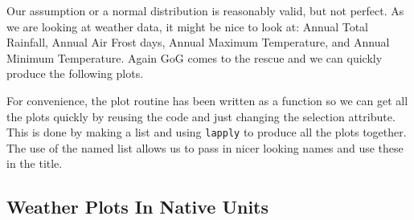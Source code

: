 \documentclass{article}
\begin{document}
Our assumption or a normal distribution is reasonably valid, but not perfect. As we are looking at weather data, it might be nice to look at: Annual Total Rainfall, Annual Air Frost days, Annual Maximum Temperature, and Annual Minimum Temperature. Again GoG comes to the rescue and we can quickly produce the following plots.

For convenience, the plot routine has been written as a function so we can get all the plots quickly by reusing the code and just changing the selection attribute. This is done by making a list and using \texttt{lapply} to produce all the plots together. The use of the named list allows us to pass in nicer looking names and use these in the title.

\hypertarget{weather-plots-in-native-units}{%
\subsection{Weather Plots In Native Units}\label{weather-plots-in-native-units}}
\end{document}
